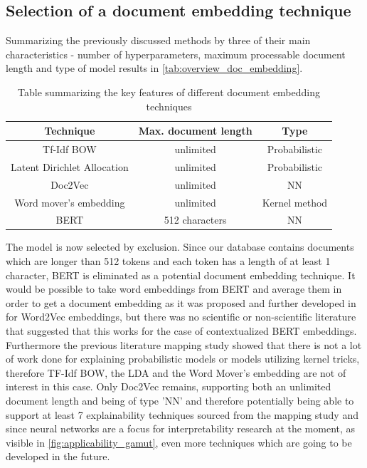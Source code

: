 \subsection{Selection of a document embedding technique}

Summarizing the previously discussed methods by three of their main characteristics - number of hyperparameters, maximum processable document length and type of model results in  \autoref{tab:overview_doc_embedding}.
\begin{table}
	\centering
	\begin{tabular}{ c | c | c }
		\hline 
		Technique & Max. document length & Type \\ \hline
		Tf-Idf BOW & unlimited & Probabilistic \\ \hline
		Latent Dirichlet Allocation & unlimited & Probabilistic \\ \hline
		Doc2Vec & unlimited & NN \\ \hline
		Word mover's embedding & unlimited & Kernel method \\ \hline
		BERT & 512 characters & NN \\ \hline
	\end{tabular}
	\caption{\label{tab:overview_doc_embedding} Table summarizing the key features of different document embedding techniques}
\end{table}

The model is now selected by exclusion. Since our database contains documents which are longer than 512 tokens and each token has a length of at least 1 character, BERT is eliminated as a potential document embedding technique. It would be possible to take word embeddings from BERT and average them in order to get a document embedding as it was proposed and further developed in \cite{deboomRepresentationLearningVery2016} for Word2Vec embeddings, but there was no scientific or non-scientific literature that suggested that this works for the case of contextualized BERT embeddings.
Furthermore the previous literature mapping study showed that there is not a lot of work done for explaining probabilistic models or models utilizing kernel tricks, therefore TF-Idf BOW, the LDA and the Word Mover's embedding are not of interest in this case. Only Doc2Vec remains, supporting both an unlimited document length and being of type 'NN' and therefore potentially being able to support at least 7 explainability techniques sourced from the mapping study and since neural networks are a focus for interpretability research at the moment, as visible in \autoref{fig:applicability_gamut}, even more techniques which are going to be developed in the future.

